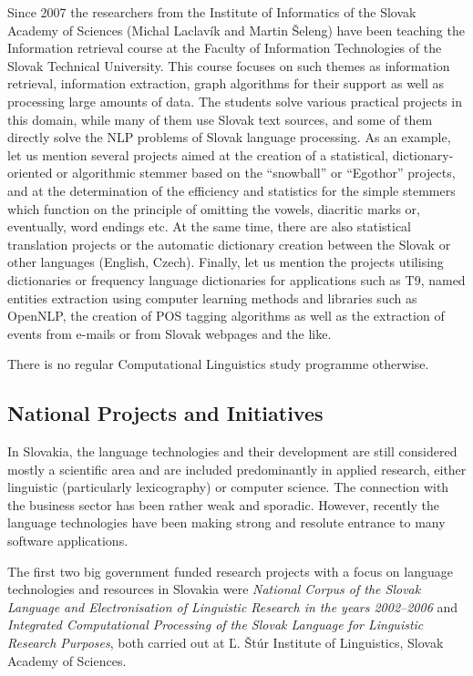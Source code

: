 \begin{multicols}{2}

Since 2007 the researchers from the Institute of Informatics of the Slovak Academy of Sciences (Michal Laclavík and Martin Šeleng) have been teaching the Information retrieval course\cite{f30} at the Faculty of Information Technologies of the Slovak Technical University. This course focuses on such themes as information retrieval, information extraction, graph algorithms for their support as well as processing large amounts of data. The students solve various practical projects in this domain, while many of them use Slovak text sources, and some of them directly solve the NLP problems of Slovak language processing. As an example, let us mention several projects aimed at the creation of a statistical, dictionary-oriented or algorithmic stemmer based on the  “snowball” or “Egothor” projects, and at the determination of the efficiency and statistics for the simple stemmers which function on the principle of omitting the vowels, diacritic marks or, eventually, word endings etc. At the same time, there are also statistical translation projects or the automatic dictionary creation between the Slovak or other languages (English, Czech). Finally, let us mention the projects utilising dictionaries or frequency language dictionaries for applications such as T9, named entities extraction using computer learning methods and libraries such as OpenNLP, the creation of POS tagging algorithms as well as the extraction of events from e-mails or from Slovak webpages and the like.

There is no regular Computational Linguistics study programme otherwise.

\subsection{National Projects and Initiatives}
In Slovakia, the language technologies and their development are still considered mostly a scientific
area and are included predominantly in applied research, either linguistic
(particularly lexicography) or computer science. The connection with the
business sector has been rather weak and sporadic. However, recently the
language technologies have been making strong and resolute entrance to many
software applications.

The first two big government funded research projects with a focus on language
technologies and resources in Slovakia were \emph{National Corpus of the Slovak Language and
Electronisation of Linguistic Research in the years 2002--2006} and \emph{Integrated Computational
Processing of the Slovak Language for Linguistic Research Purposes}, both
carried out at Ľ. Štúr Institute of Linguistics, Slovak Academy of Sciences.


\end{multicols}
